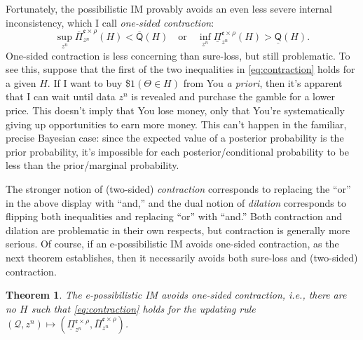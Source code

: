 \documentclass[a4paper, 12pt]{article}
\theoremstyle{plain}
\newtheorem{thm}{Theorem}
\theoremstyle{definition}
\theoremstyle{remark}
\newcommand{\credal}{\mathscr{Q}}
\newcommand{\lPi}{\underline{\Pi}}
\newcommand{\uPi}{\overline{\Pi}}
\newcommand{\lprior}{\underline{\mathsf{Q}}}
\newcommand{\uprior}{\overline{\mathsf{Q}}}
\newcommand{\eval}{\mathfrak{e}}
\begin{document}
Fortunately, the possibilistic IM provably avoids an even less severe internal inconsistency, which I call {\em one-sided contraction}:
\begin{equation}
\label{eq:contraction}
\sup_{z^n} \uPi_{z^n}^{\eval \times \rho}(H) < \uprior(H) \quad \text{or} \quad \inf_{z^n} \lPi_{z^n}^{\eval \times \rho}(H) > \lprior(H). 
\end{equation}
One-sided contraction is less concerning than sure-loss, but still problematic.  To see this, suppose that the first of the two inequalities in \eqref{eq:contraction} holds for a given $H$.  If I want to buy \$$1(\Theta \in H)$ from You {\em a priori}, then it's apparent that I can wait until data $z^n$ is revealed and purchase the gamble for a lower price.  This doesn't imply that You lose money, only that You're systematically giving up opportunities to earn more money.  This can't happen in the familiar, precise Bayesian case: since the expected value of a posterior probability is the prior probability, it's impossible for each posterior/conditional probability to be less than the prior/marginal probability.  

The stronger notion of (two-sided) {\em contraction} corresponds to replacing the ``or'' in the above display with ``and,'' and the dual notion of {\em dilation} corresponds to flipping both inequalities and replacing ``or'' with ``and.'' Both contraction and dilation are problematic in their own respects, but contraction is generally more serious.  Of course, if an e-possibilistic IM avoids one-sided contraction, as the next theorem establishes, then it necessarily avoids both sure-loss and (two-sided) contraction.  

\begin{thm}
\label{thm:no.sure.loss}
The e-possibilistic IM avoids one-sided contraction, i.e., there are no $H$ such that \eqref{eq:contraction} holds for the updating rule $(\credal, z^n) \mapsto (\lPi_{z^n}^{\eval \times \rho}, \uPi_{z^n}^{\eval \times \rho})$. 
\end{thm}
\end{document}
